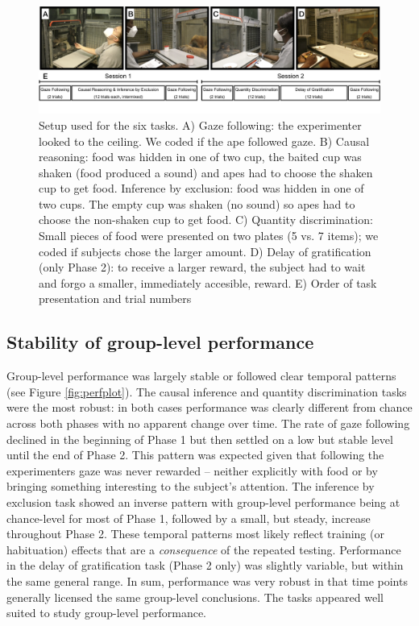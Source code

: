 \documentclass[
  man,floatsintext]{apa6}
\begin{document}
\begin{figure}
\includegraphics[width=1\linewidth]{./figures/setup} \caption{Setup used for the six tasks. A) Gaze following: the experimenter looked to the ceiling. We coded if the ape followed gaze. B) Causal reasoning: food was hidden in one of two cup, the baited cup was shaken (food produced a sound) and apes had to choose the shaken cup to get food. Inference by exclusion: food was hidden in one of two cups. The empty cup was shaken (no sound) so apes had to choose the non-shaken cup to get food. C) Quantity discrimination: Small pieces of food were presented on two plates (5 vs. 7 items); we coded if subjects chose the larger amount. D) Delay of gratification (only Phase 2): to receive a larger reward, the subject had to wait and forgo a smaller, immediately accesible, reward. E) Order of task presentation and trial numbers}\label{fig:setup}
\end{figure}

\hypertarget{stability-of-group-level-performance}{%
\subsection{Stability of group-level performance}\label{stability-of-group-level-performance}}

Group-level performance was largely stable or followed clear temporal patterns (see Figure \ref{fig:perfplot}). The causal inference and quantity discrimination tasks were the most robust: in both cases performance was clearly different from chance across both phases with no apparent change over time. The rate of gaze following declined in the beginning of Phase 1 but then settled on a low but stable level until the end of Phase 2. This pattern was expected given that following the experimenters gaze was never rewarded -- neither explicitly with food or by bringing something interesting to the subject's attention. The inference by exclusion task showed an inverse pattern with group-level performance being at chance-level for most of Phase 1, followed by a small, but steady, increase throughout Phase 2. These temporal patterns most likely reflect training (or habituation) effects that are a \emph{consequence} of the repeated testing. Performance in the delay of gratification task (Phase 2 only) was slightly variable, but within the same general range. In sum, performance was very robust in that time points generally licensed the same group-level conclusions. The tasks appeared well suited to study group-level performance.
\end{document}

